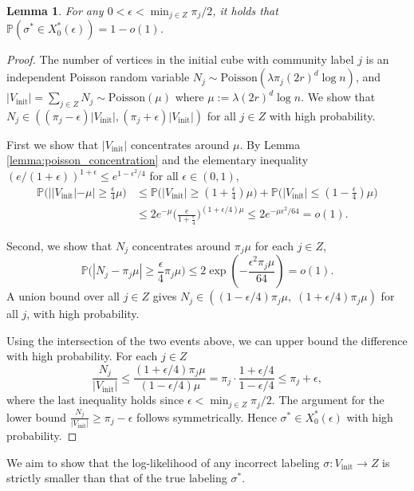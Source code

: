 \documentclass[11pt, a4paper]{amsart}
\newtheorem{lemma}[theorem]{Lemma}
\newcommand{\1}{\mathbf{1}}
\theoremstyle{definition}
\theoremstyle{remark}
\theoremstyle{definition}
\begin{document}
\begin{lemma}
\label{lem:restr mle proof}
For any $0 < \epsilon < \min_{j \in Z}\pi_{j}/2$, it holds that $\mathbb{P}(\sigma^* \in X_0^*(\epsilon)) = 1 - o(1)$.
\end{lemma}
\begin{proof}
The number of vertices in the initial cube with community label $j$ is an independent Poisson random variable $N_j \sim \text{Poisson}(\lambda \pi_j (2r)^d \log n)$, and $|V_{\mathrm{init}}| = \sum_{j \in  Z} N_j \sim \text{Poisson}(\mu)$ where $\mu := \lambda (2r)^d \log n$. We show that $N_j \in ((\pi_j - \epsilon)|V_{\mathrm{init}}|, (\pi_j + \epsilon)|V_{\mathrm{init}}|)$ for all $j \in Z$ with high probability.

First we show that $|V_{\mathrm{init}}|$ concentrates around $\mu$. By Lemma \ref{lemma:poisson_concentration} and the elementary inequality $(e/(1+\epsilon))^{1+\epsilon}\le e^{1-\epsilon^2/4}$ for all $\epsilon \in (0,1)$,
\begin{align*}
\mathbb{P}\Big(||V_{\mathrm{init}}| - \mu| \geq \frac{\epsilon}{4}\mu\Big) &\leq \mathbb{P}\Big(|V_{\mathrm{init}}| \ge (1+\frac{\epsilon}{4} ) \mu\Big) +  \mathbb{P}\Big(|V_{\mathrm{init}}| \le (1-\frac{\epsilon}{4} ) \mu\Big)\\
&\le 2 e^{-\mu} \Big(\frac{e}{1+\frac \epsilon 4}\Big)^{(1+\epsilon/4)\mu} \le 2 e^{-\mu \epsilon^2/64}= o(1).
\end{align*}

Second, we show that $N_j$ concentrates around $\pi_j \mu$ for each $j \in  Z$,
\[
\mathbb{P}\Big(|N_j - \pi_j \mu| \geq \frac{\epsilon}{4} \pi_j \mu\Big) \leq 2\exp\left(-\frac{\epsilon^2 \pi_j \mu}{64}\right)= o(1).
\]
A union bound over all $j \in  Z$ gives $N_j \in ((1 - \epsilon/4)\pi_j\mu,\; (1 + \epsilon/4)\pi_j\mu)$ for all $j$, with high probability.

Using the intersection of the two events above, we can upper bound the difference with high probability. For each $j \in  Z$
\[
\frac{N_j}{|V_{\mathrm{init}}|} \leq \frac{(1+\epsilon/4)\pi_j\mu}{(1-\epsilon/4)\mu} = \pi_j\cdot\frac{1+\epsilon/4}{1-\epsilon/4} \leq \pi_j + \epsilon,
\]
where the last inequality holds since $\epsilon < \min_{j \in Z}\pi_{j}/2$. The argument for the lower bound $\frac{N_j}{|V_{\mathrm{init}}|} \geq \pi_j - \epsilon$ follows symmetrically. Hence $\sigma^* \in X_0^*(\epsilon)$ with high probability.
\end{proof}


We aim to show that the log-likelihood of any incorrect labeling $\sigma: {V_{\mathrm{init}}} \rightarrow {Z}$ is strictly smaller than that of the true labeling $\sigma^*$.
\end{document}
